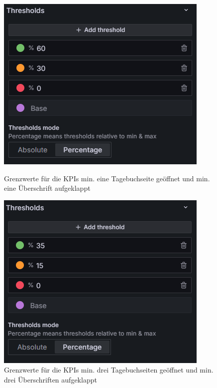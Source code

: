 \begin{figure}[H]
    \centering
    \begin{minipage}{0.49\textwidth}
        \centering
        \includegraphics[width=\linewidth, keepaspectratio]{images/thresholds-min-eins.png}
        \caption{Grenzwerte für die KPIs \glqq min. eine Tagebuchseite geöffnet\grqq{} und \glqq min. eine Überschrift aufgeklappt\grqq{}}
        \label{fig:thresholds-min-eins}
    \end{minipage}
    \hfill
    \begin{minipage}{0.49\textwidth}
        \centering
        \includegraphics[width=\linewidth, keepaspectratio]{images/thresholds-min-drei.png}
        \caption{Grenzwerte für die KPIs \glqq min. drei Tagebuchseiten geöffnet\grqq{} und \glqq min. drei Überschriften aufgeklappt\grqq{}}
        \label{fig:thresholds-min-drei}
    \end{minipage}
\end{figure}

